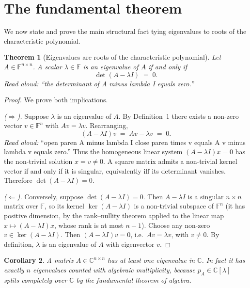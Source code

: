 \documentclass[11pt]{article}
\newtheorem{theorem}{Theorem}
\newtheorem{corollary}[theorem]{Corollary}
\theoremstyle{definition}
\theoremstyle{remark}
\newcommand{\C}{\mathbb{C}}
\newcommand{\F}{\mathbb{F}}
\begin{document}
\section{The fundamental theorem}

We now state and prove the main structural fact tying eigenvalues to
roots of the characteristic polynomial.

\begin{theorem}[Eigenvalues are roots of the characteristic polynomial]
\label{thm:char-poly}
Let $A \in \F^{n \times n}$. A scalar $\lambda \in \F$ is an eigenvalue
of $A$ if and only if
\[
  \det(A - \lambda I) \;=\; 0.
\]
\emph{Read aloud:} ``the determinant of A minus lambda I equals zero.''
\end{theorem}

\begin{proof}
We prove both implications.

\smallskip
\noindent\emph{($\Rightarrow$).} Suppose $\lambda$ is an eigenvalue of
$A$. By Definition~1 there exists a non-zero vector $v \in \F^{n}$ with
$A v = \lambda v$. Rearranging,
\[
  (A - \lambda I) v \;=\; A v - \lambda v \;=\; 0.
\]
\emph{Read aloud:} ``open paren A minus lambda I close paren times v equals A v minus lambda v equals zero.''
Thus the homogeneous linear system $(A - \lambda I) x = 0$ has the
non-trivial solution $x = v \ne 0$. A square matrix admits a non-trivial
kernel vector if and only if it is singular, equivalently iff its
determinant vanishes. Therefore $\det(A - \lambda I) = 0$.

\smallskip
\noindent\emph{($\Leftarrow$).} Conversely, suppose $\det(A - \lambda I)
= 0$. Then $A - \lambda I$ is a singular $n\times n$ matrix over $\F$,
so its kernel $\ker(A - \lambda I)$ is a non-trivial subspace of
$\F^{n}$ (it has positive dimension, by the rank--nullity theorem applied
to the linear map $x \mapsto (A - \lambda I) x$, whose rank is at most
$n - 1$). Choose any non-zero $v \in \ker(A - \lambda I)$. Then
$(A - \lambda I) v = 0$, i.e.\ $A v = \lambda v$, with $v \ne 0$. By
definition, $\lambda$ is an eigenvalue of $A$ with eigenvector $v$.
\end{proof}

\begin{corollary}
A matrix $A \in \C^{n\times n}$ has at least one eigenvalue in $\C$. In
fact it has exactly $n$ eigenvalues counted with algebraic multiplicity,
because $p_A \in \C[\lambda]$ splits completely over $\C$ by the
fundamental theorem of algebra.
\end{corollary}
\end{document}
